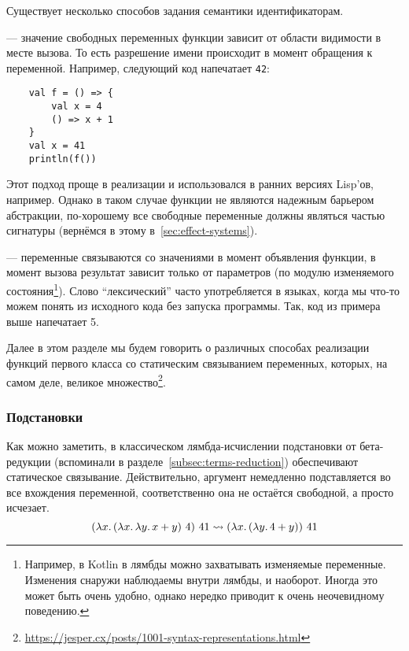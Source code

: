 Существует несколько способов задания семантики идентификаторам.

 --- значение свободных переменных функции зависит от области видимости в месте вызова.
То есть разрешение имени происходит в момент обращения к переменной.
Например, следующий код напечатает \texttt{42}:
\begin{verbatim}
    val f = () => {
        val x = 4
        () => x + 1
    }
    val x = 41
    println(f())
\end{verbatim}

Этот подход проще в реализации и использовался в ранних версиях Lisp'ов, например.
Однако в таком случае функции не являются надежным барьером абстракции, по-хорошему все свободные переменные должны являться частью сигнатуры (вернёмся в этому в~\ref{sec:effect-systems}).

 --- переменные связываются со значениями в момент объявления функции, в момент вызова результат зависит только от параметров (по модулю изменяемого состояния\footnote{Например, в Kotlin в лямбды можно захватывать изменяемые переменные. Изменения снаружи наблюдаемы внутри лямбды, и наоборот. Иногда это может быть очень удобно, однако нередко приводит к очень неочевидному поведению.}).
Слово ``лексический'' часто употребляется в языках, когда мы что-то можем понять из исходного кода без запуска программы.
Так, код из примера выше напечатает 5.

Далее в этом разделе мы будем говорить о различных способах реализации функций первого класса со статическим связыванием переменных, которых, на самом деле, великое множество\footnote{\url{https://jesper.cx/posts/1001-syntax-representations.html}}.

\subsubsection{Подстановки} \label{subsubsec:substitutions}

Как можно заметить, в классическом лямбда-исчислении подстановки от бета-редукции (вспоминали в разделе~\ref{subsec:terms-reduction}) обеспечивают статическое связывание.
Действительно, аргумент немедленно подставляется во все вхождения переменной, соответственно она не остаётся свободной, а просто исчезает.
\[
    (\lambda x\ldotp (\lambda x\ldotp \lambda y\ldotp x + y) ~ 4) ~ 41 \rightsquigarrow (\lambda x\ldotp (\lambda y\ldotp 4 + y)) ~ 41
\]

